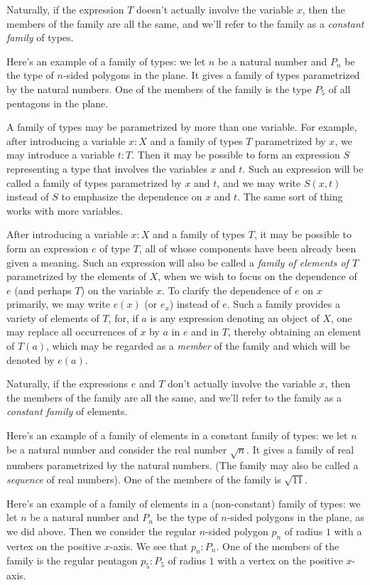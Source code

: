Naturally, if the expression $T$ doesn't actually involve the variable $x$, then the members of the family are all the same,
and we'll refer to the family as a \emph{constant family} of types.

Here's an example of a family of types: we let $n$ be a natural number and $P_n$ be the type of $n$-sided polygons in the plane.  It gives a family
of types parametrized by the natural numbers.  One of the members of the family is the type $P_5$ of all pentagons in the plane.

A family of types may be parametrized by more than one variable.  For example, after introducing a variable $x:X$ and a family of types $T$
parametrized by $x$, we may introduce a variable $t:T$.  Then it may be possible to form an expression $S$ representing a type that involves the
variables $x$ and $t$.  Such an expression will be called a family of types parametrized by $x$ and $t$, and we may write $S(x,t)$ instead of
$S$ to emphasize the dependence on $x$ and $t$.  The same sort of thing works with more variables. 

After introducing a variable $x:X$ and a family of types $T$, it may be possible to form an expression $e$ of type $T$, all of whose components have been already been
given a meaning.
Such an expression will also be called a \emph{family of elements of $T$}  parametrized by the elements of $X$, when
we wish to focus on the dependence of $e$ (and perhaps $T$) on the variable $x$.
To clarify the dependence of $e$ on $x$ primarily, we may write $e(x)$ (or $e_x$) instead of $e$.
Such a family provides a variety of elements of $T$, for, if $a$ is any expression denoting an object of $X$, one may replace all
occurrences of $x$ by $a$ in $e$ and in $T$, thereby obtaining an element of $T(a)$, which may be regarded as a \emph{member} of the family
and which will be denoted by $e(a)$.

Naturally, if the expressions $e$ and $T$ don't actually involve the variable $x$, then the members of the family are all the same,
and we'll refer to the family as a \emph{constant family} of elements.

Here's an example of a family of elements in a constant family of types: we let $n$ be a natural number and consider the real number $\sqrt n$.
It gives a family of real numbers parametrized by the natural numbers.
(The family may also be called a \emph{sequence} of real numbers).
One of the members of the family is $\sqrt{11}$.

Here's an example of a family of elements in a (non-constant) family of types: we let $n$ be a natural number and $P_n$ be the type of $n$-sided
polygons in the plane, as we did above.  Then we consider the regular $n$-sided polygon $p_n$ of radius $1$ with a vertex on the positive $x$-axis.  We
see that $p_n : P_n$.  One of the members of the family is the regular pentagon $p_5 : P_5$ of radius $1$ with a vertex on the positive $x$-axis.

